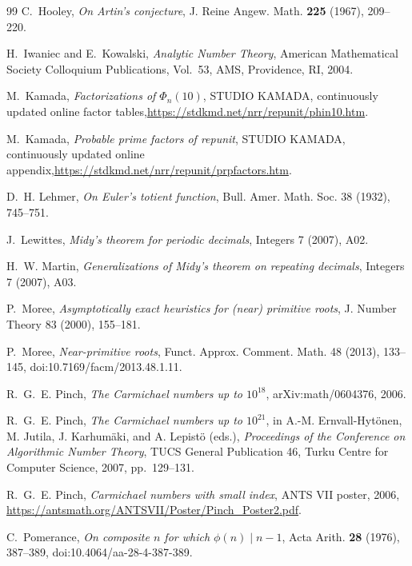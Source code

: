 \documentclass[11pt]{article}
\begin{document}
\begin{thebibliography}{99}
C.~Hooley,
\emph{On Artin's conjecture},
J. Reine Angew. Math. \textbf{225} (1967), 209--220.

H.~Iwaniec and E.~Kowalski,
\emph{Analytic Number Theory},
American Mathematical Society Colloquium Publications, Vol.~53,
AMS, Providence, RI, 2004.

M.~Kamada,
\emph{Factorizations of $\Phi_n(10)$},
STUDIO KAMADA, continuously updated online factor tables,\newline\url{https://stdkmd.net/nrr/repunit/phin10.htm}.

M.~Kamada,
\emph{Probable prime factors of repunit},
STUDIO KAMADA, continuously updated online appendix,\newline\url{https://stdkmd.net/nrr/repunit/prpfactors.htm}.

D.~H. Lehmer,
\emph{On Euler's totient function},
Bull. Amer. Math. Soc. 38 (1932), 745--751.

J.~Lewittes,
\emph{Midy's theorem for periodic decimals},
Integers 7 (2007), A02.

H.~W. Martin,
\emph{Generalizations of Midy's theorem on repeating decimals},
Integers 7 (2007), A03.

P.~Moree,
\emph{Asymptotically exact heuristics for (near) primitive roots},
J. Number Theory 83 (2000), 155--181.

P.~Moree,
\emph{Near-primitive roots},
Funct. Approx. Comment. Math. 48 (2013), 133--145,
doi:10.7169/facm/2013.48.1.11.

R.~G.~E. Pinch,
\emph{The Carmichael numbers up to $10^{18}$},
arXiv:math/0604376, 2006.

R.~G.~E. Pinch,
\emph{The Carmichael numbers up to $10^{21}$},
in A.-M. Ernvall-Hyt\"onen, M. Jutila, J. Karhum\"aki, and A. Lepist\"o (eds.),
\emph{Proceedings of the Conference on Algorithmic Number Theory},
TUCS General Publication 46, Turku Centre for Computer Science, 2007,
pp.~129--131.

R.~G.~E. Pinch,
\emph{Carmichael numbers with small index},
ANTS VII poster, 2006,
\url{https://antsmath.org/ANTSVII/Poster/Pinch_Poster2.pdf}.

C.~Pomerance,
\emph{On composite $n$ for which $\phi(n)\mid n-1$},
Acta Arith. \textbf{28} (1976), 387--389,
doi:10.4064/aa-28-4-387-389.


\end{thebibliography}
\end{document}

